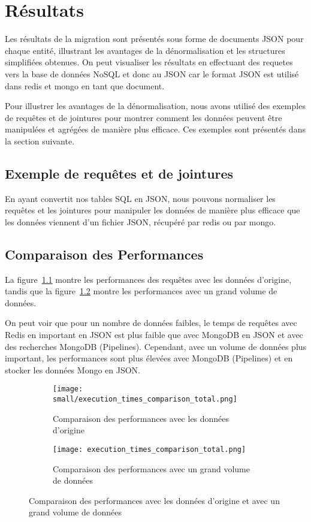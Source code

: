 \chapter{Résultats}
Les résultats de la migration sont présentés sous forme de documents JSON pour chaque entité, illustrant les avantages de la dénormalisation et les structures simplifiées obtenues. On peut visualiser les résultats en effectuant des requetes vers la base de données NoSQL et donc au JSON car le format JSON est utilisé dans redis et mongo en tant que document.

Pour illustrer les avantages de la dénormalisation, nous avons utilisé des exemples de requêtes et de jointures pour montrer comment les données peuvent être manipulées et agrégées de manière plus efficace. Ces exemples sont présentés dans la section suivante.

\section{Exemple de requêtes et de jointures}

En ayant convertit nos tables SQL en JSON, nous pouvons normaliser les requêtes et les jointures pour manipuler les données de manière plus efficace que les données viennent d'un fichier JSON, récupéré par redis ou par mongo.

\section{Comparaison des Performances}

La figure~\ref{fig:image1} montre les performances des requêtes avec les données d'origine, tandis que la figure~\ref{fig:image2} montre les performances avec un grand volume de données.

On peut voir que pour un nombre de données faibles, le temps de requêtes avec Redis en important en JSON est plus faible que avec MongoDB en JSON et avec des recherches MongoDB (Pipelines). Cependant, avec un volume de données plus important, les performances sont plus élevées avec MongoDB (Pipelines) et en stocker les données Mongo en JSON.\@

\begin{figure}[H]
  \centering
  \begin{subfigure}[t]{0.45\textwidth}
    \centering
    \texttt{[image: small/execution\_times\_comparison\_total.png]}
    \caption{Comparaison des performances avec les données d'origine}
    \label{fig:image1}
  \end{subfigure}
  \hfill
  \begin{subfigure}[t]{0.45\textwidth}
    \centering
    \texttt{[image: execution\_times\_comparison\_total.png]}
    \caption{Comparaison des performances avec un grand volume de données}
    \label{fig:image2}
  \end{subfigure}
  \caption{Comparaison des performances avec les données d'origine et avec un grand volume de données}
  \label{fig:comparaison_performances}
\end{figure}
